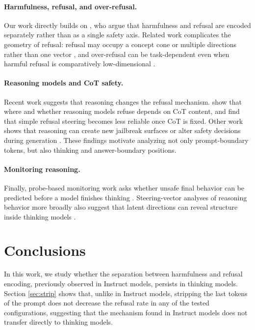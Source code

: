 \documentclass[nohyperref]{article}
\theoremstyle{plain}
\theoremstyle{definition}
\theoremstyle{remark}
\begin{document}
\paragraph{Harmfulness, refusal, and over-refusal.} Our work directly builds on \citet{zhao2025harmfulness}, who argue that harmfulness and refusal are encoded separately rather than as a single safety axis. Related work complicates the geometry of refusal: refusal may occupy a concept cone or multiple directions rather than one vector \citep{wollschlager2025geometry, joad2026more}, and over-refusal can be task-dependent even when harmful refusal is comparatively low-dimensional \citep{wang2024surgical, maskey2026overrefusal}.

\paragraph{Reasoning models and CoT safety.} Recent work suggests that reasoning changes the refusal mechanism. \citet{yamaguchi2026where} show that where and whether reasoning models refuse depends on CoT content, and \citet{yang2026beyond} find that simple refusal steering becomes less reliable once CoT is fixed. Other work shows that reasoning can create new jailbreak surfaces or alter safety decisions during generation \citep{yong2026selfjailbreaking, zhao2026cothijacking, refusalcliff2025}. These findings motivate analyzing not only prompt-boundary tokens, but also thinking and answer-boundary positions.

\paragraph{Monitoring reasoning.} Finally, probe-based monitoring work asks whether unsafe final behavior can be predicted before a model finishes thinking \citep{predictalignment2025}. Steering-vector analyses of reasoning behavior more broadly also suggest that latent directions can reveal structure inside thinking models \citep{venhoff2025understanding}.



\section{Conclusions}
In this work, we study whether the separation between harmfulness and refusal encoding, previously observed in Instruct models, persists in thinking models. Section \ref{sec:strip} shows that, unlike in Instruct models, stripping the last tokens of the prompt does not decrease the refusal rate in any of the tested configurations, suggesting that the mechanism found in Instruct models does not transfer directly to thinking models.
\end{document}
